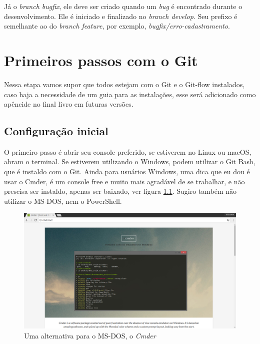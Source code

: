 \documentclass[12pt,openright,oneside,a4paper,english,brazil]{abntex2}
\begin{document}
Já o \textit{branch bugfix}, ele deve ser criado quando um \textit{bug} é encontrado durante o desenvolvimento. Ele é iniciado e finalizado no \textit{branch develop}. Seu prefixo é semelhante ao do \textit{branch feature}, por exemplo, \textit{bugfix/erro-cadastramento}.

\chapter{Primeiros passos com o Git}

Nessa etapa vamos supor que todos estejam com o Git e o Git-flow instalados, caso haja a necessidade de um guia para as instalações, esse será adicionado como apêncide no final livro em futuras versões.

\section{Configuração inicial}

O primeiro passo é abrir seu console preferido, se estiverem no Linux ou macOS, abram o terminal. Se estiverem utilizando o Windows, podem utilizar o Git Bash, que é instaldo com o Git. Ainda para usuários Windows, uma dica que eu dou é usar o Cmder, é um console free e muito mais agradável de se trabalhar, e não prescisa ser instaldo, apenas ser baixado, ver figura \ref{cmder}. Sugiro também não utilizar o MS-DOS, nem o PowerShell.

\begin{figure}[h]
	\caption{\label{cmder}Uma alternativa para o MS-DOS, o \textit{Cmder}}
	\begin{center}
		\includegraphics[width=1\linewidth]{cmder}
	\end{center}
\end{figure}
\end{document}
